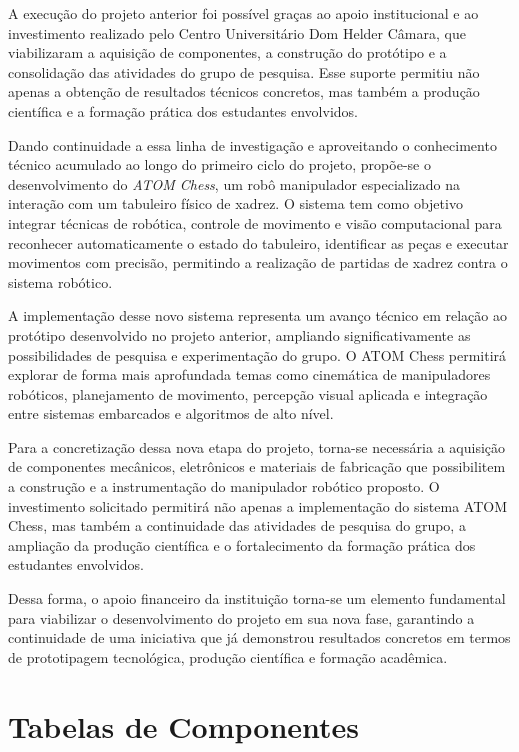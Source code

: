 \documentclass[12pt]{article}
\begin{document}
A execução do projeto anterior foi possível graças ao apoio institucional e ao investimento realizado pelo Centro Universitário Dom Helder Câmara, que viabilizaram a aquisição de componentes, a construção do protótipo e a consolidação das atividades do grupo de pesquisa. Esse suporte permitiu não apenas a obtenção de resultados técnicos concretos, mas também a produção científica e a formação prática dos estudantes envolvidos.

Dando continuidade a essa linha de investigação e aproveitando o conhecimento técnico acumulado ao longo do primeiro ciclo do projeto, propõe-se o desenvolvimento do \textit{ATOM Chess}, um robô manipulador especializado na interação com um tabuleiro físico de xadrez. O sistema tem como objetivo integrar técnicas de robótica, controle de movimento e visão computacional para reconhecer automaticamente o estado do tabuleiro, identificar as peças e executar movimentos com precisão, permitindo a realização de partidas de xadrez contra o sistema robótico.

A implementação desse novo sistema representa um avanço técnico em relação ao protótipo desenvolvido no projeto anterior, ampliando significativamente as possibilidades de pesquisa e experimentação do grupo. O ATOM Chess permitirá explorar de forma mais aprofundada temas como cinemática de manipuladores robóticos, planejamento de movimento, percepção visual aplicada e integração entre sistemas embarcados e algoritmos de alto nível.

Para a concretização dessa nova etapa do projeto, torna-se necessária a aquisição de componentes mecânicos, eletrônicos e materiais de fabricação que possibilitem a construção e a instrumentação do manipulador robótico proposto. O investimento solicitado permitirá não apenas a implementação do sistema ATOM Chess, mas também a continuidade das atividades de pesquisa do grupo, a ampliação da produção científica e o fortalecimento da formação prática dos estudantes envolvidos.

Dessa forma, o apoio financeiro da instituição torna-se um elemento fundamental para viabilizar o desenvolvimento do projeto em sua nova fase, garantindo a continuidade de uma iniciativa que já demonstrou resultados concretos em termos de prototipagem tecnológica, produção científica e formação acadêmica.
\section{Tabelas de Componentes}
\end{document}
